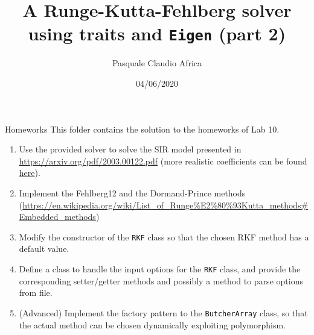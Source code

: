 \documentclass[10pt]{beamer}
\begin{document}
    \title{A Runge-Kutta-Fehlberg solver\protect\\ using traits and \texttt{Eigen} (part 2)}
    \author{Pasquale Claudio Africa}
    \date{04/06/2020}

\begin{frame}
    \maketitle
\end{frame}

\begin{frame}{Homeworks}
This folder contains the solution to the homeworks of Lab 10.
\begin{enumerate}
\item Use the provided solver to solve the SIR model presented in \url{https://arxiv.org/pdf/2003.00122.pdf} (more realistic coefficients can be found \href{https://arxiv.org/pdf/2003.14391.pdf}{\textcolor{title.fg}{here}}).
\item Implement the Fehlberg12 and the Dormand-Prince methods (\url{https://en.wikipedia.org/wiki/List_of_Runge\%E2\%80\%93Kutta_methods\#Embedded_methods})
\item Modify the constructor of the \texttt{RKF} class so that the chosen RKF method has a default value.

\item Define a class to handle the input options for the \texttt{RKF} class, and provide the corresponding setter/getter methods and possibly a method to parse options from file.

\item (Advanced) Implement the factory pattern to the \texttt{ButcherArray} class, so that the actual method can be chosen dynamically exploiting polymorphism.
\end{enumerate}
\end{frame}
\end{document}
